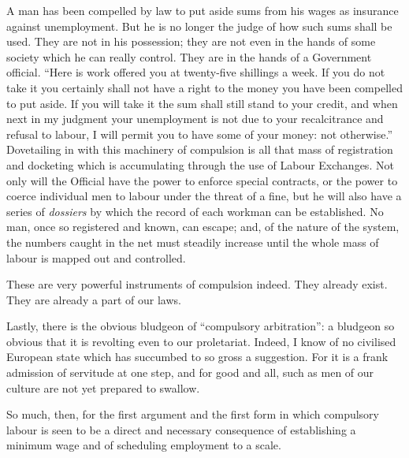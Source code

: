 \documentclass{book}
\begin{document}
A man has been compelled by law to put aside sums from his wages as insurance against unemployment. But he is no longer the judge of how such sums shall be used. They are not in his possession; they are not even in the hands of some society which he can really control. They are in the hands of a Government official. “Here is work offered you at twenty-five shillings a week. If you do not take it you certainly shall not have a right to the money you have been compelled to put aside. If you will take it the sum shall still stand to your credit, and when next in my judgment your unemployment is not due to your recalcitrance and refusal to labour, I will permit you to have some of your money: not otherwise.” Dovetailing in with this machinery of compulsion is all that mass of registration and docketing which is accumulating through the use of Labour Exchanges. Not only will the Official have the power to enforce special contracts, or the power to coerce individual men to labour under the threat of a fine, but he will also have a series of \emph{dossiers} by which the record of each workman can be established. No man, once so registered and known, can escape; and, of the nature of the system, the numbers caught in the net must steadily increase until the whole mass of labour is mapped out and controlled.

These are very powerful instruments of compulsion indeed. They already exist. They are already a part of our laws.

Lastly, there is the obvious bludgeon of “compulsory arbitration”: a bludgeon so obvious that it is revolting even to our proletariat. Indeed, I know of no civilised European state which has succumbed to so gross a suggestion. For it is a frank admission of servitude at one step, and for good and all, such as men of our culture are not yet prepared to swallow.\footnotemark[2]

So much, then, for the first argument and the first form in which compulsory labour is seen to be a direct and necessary consequence of establishing a minimum wage and of scheduling employment to a scale.
\end{document}
